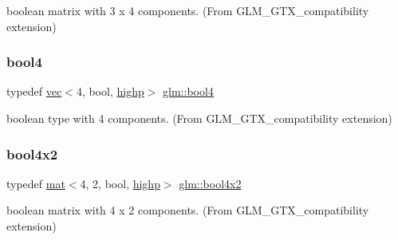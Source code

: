 boolean matrix with 3 x 4 components. (From G\+L\+M\+\_\+\+G\+T\+X\+\_\+compatibility extension) 

\mbox{\label{group__gtx__compatibility_ga16892e963e3aa2aa6c826a508d2df3ce}} 
\subsubsection{\texorpdfstring{bool4}{bool4}}
{\footnotesize\ttfamily typedef \hyperlink{structglm_1_1vec}{vec}$<$4, bool, \hyperlink{namespaceglm_a36ed105b07c7746804d7fdc7cc90ff25ac6f7eab42eacbb10d59a58e95e362074}{highp}$>$ \hyperlink{group__gtx__compatibility_ga16892e963e3aa2aa6c826a508d2df3ce}{glm\+::bool4}}



boolean type with 4 components. (From G\+L\+M\+\_\+\+G\+T\+X\+\_\+compatibility extension) 

\mbox{\label{group__gtx__compatibility_gaad9844846cb1d1f74c4b00ddb8e582ef}} 
\subsubsection{\texorpdfstring{bool4x2}{bool4x2}}
{\footnotesize\ttfamily typedef \hyperlink{structglm_1_1mat}{mat}$<$4, 2, bool, \hyperlink{namespaceglm_a36ed105b07c7746804d7fdc7cc90ff25ac6f7eab42eacbb10d59a58e95e362074}{highp}$>$ \hyperlink{group__gtx__compatibility_gaad9844846cb1d1f74c4b00ddb8e582ef}{glm\+::bool4x2}}



boolean matrix with 4 x 2 components. (From G\+L\+M\+\_\+\+G\+T\+X\+\_\+compatibility extension) 

\mbox{\label{group__gtx__compatibility_gab1a5519fb12e67d9940fa4d9b4590198}} 
